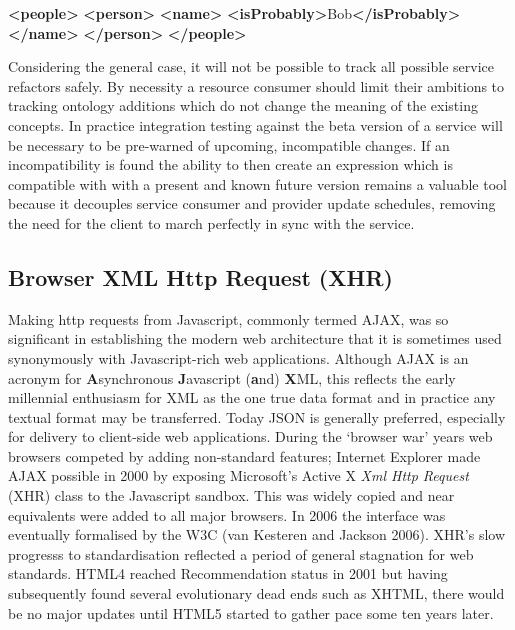 \documentclass[]{article}
\newenvironment{Shaded}{}{}
\newcommand{\KeywordTok}[1]{\textcolor[rgb]{0.00,0.44,0.13}{\textbf{{#1}}}}
\newcommand{\NormalTok}[1]{{#1}}
\begin{document}
\begin{Shaded}
\begin{Highlighting}[]
\KeywordTok{<people>}
   \KeywordTok{<person>}
      \KeywordTok{<name>}
         \KeywordTok{<isProbably>}\NormalTok{Bob}\KeywordTok{</isProbably>}
      \KeywordTok{</name>}
   \KeywordTok{</person>}
\KeywordTok{</people>}
\end{Highlighting}
\end{Shaded}

Considering the general case, it will not be possible to track all
possible service refactors safely. By necessity a resource consumer
should limit their ambitions to tracking ontology additions which do not
change the meaning of the existing concepts. In practice integration
testing against the beta version of a service will be necessary to be
pre-warned of upcoming, incompatible changes. If an incompatibility is
found the ability to then create an expression which is compatible with
with a present and known future version remains a valuable tool because
it decouples service consumer and provider update schedules, removing
the need for the client to march perfectly in sync with the service.

\subsection{Browser XML Http Request (XHR)}

Making http requests from Javascript, commonly termed AJAX, was so
significant in establishing the modern web architecture that it is
sometimes used synonymously with Javascript-rich web applications.
Although AJAX is an acronym for \textbf{A}synchronous
\textbf{J}avascript (\textbf{a}nd) \textbf{X}ML, this reflects the early
millennial enthusiasm for XML as the one true data format and in
practice any textual format may be transferred. Today JSON is generally
preferred, especially for delivery to client-side web applications.
During the `browser war' years web browsers competed by adding
non-standard features; Internet Explorer made AJAX possible in 2000 by
exposing Microsoft's Active X \emph{Xml Http Request} (XHR) class to the
Javascript sandbox. This was widely copied and near equivalents were
added to all major browsers. In 2006 the interface was eventually
formalised by the W3C (van Kesteren and Jackson 2006). XHR's slow
progresss to standardisation reflected a period of general stagnation
for web standards. HTML4 reached Recommendation status in 2001 but
having subsequently found several evolutionary dead ends such as XHTML,
there would be no major updates until HTML5 started to gather pace some
ten years later.
\end{document}
